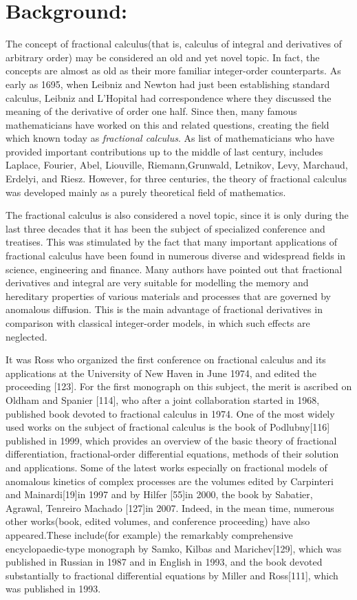 {\section{Background:}
The concept of fractional calculus(that is, calculus of integral and derivatives of arbitrary order) may be considered an old and yet novel topic. In fact, the concepts are almost as old as their more familiar integer-order counterparts. As early as 1695, when Leibniz and Newton had just been establishing standard calculus, Leibniz and L'Hopital had correspondence where they discussed the meaning of the derivative of order one half. Since then, many famous mathematicians have worked on this and related questions, creating the field which known today as \emph{fractional calculus}. As list of mathematicians who have provided important contributions up to the middle of last century, includes Laplace, Fourier, Abel, Liouville, Riemann,Grunwald, Letnikov, Levy, Marchaud, Erdelyi, and Riesz. However, for three centuries, the theory of fractional calculus was developed mainly as a purely theoretical field of mathematics.\

The fractional calculus is also considered a novel topic, since it is only during the last three decades that it has been the subject of specialized conference and treatises. This was stimulated by the fact that many important applications of fractional calculus have been found in numerous diverse and widespread fields in science, engineering and finance. Many authors have pointed out that fractional derivatives and integral are very suitable for modelling the memory and hereditary properties of various materials and processes that are governed by anomalous diffusion. This is the main advantage of fractional derivatives in comparison with classical integer-order models, in which such effects are neglected.\

It was Ross who organized the first conference on fractional calculus and its applications at
the University of New Haven in June 1974, and edited the proceeding [123]. For the first monograph on this subject, the merit is ascribed on Oldham and Spanier [114], who after a joint collaboration started in 1968, published book devoted to fractional calculus in 1974. One of the most widely used works on the subject of fractional calculus is the book of Podlubny[116] published in 1999, which provides an overview of the basic theory of fractional differentiation, fractional-order differential equations, methods of their solution and applications. Some of the latest works especially on fractional models of anomalous kinetics of complex processes are the volumes edited by Carpinteri and Mainardi[19]in 1997 and by
Hilfer [55]in 2000, the book by Sabatier, Agrawal, Tenreiro Machado [127]in 2007. Indeed, in the mean time, numerous other works(book, edited volumes, and conference proceeding) have also appeared.These include(for example) the remarkably comprehensive encyclopaedic-type monograph by Samko, Kilbas and Marichev[129], which was published in Russian in 1987 and in English in 1993, and the book devoted substantially to fractional differential equations by Miller and Ross[111], which was published in 1993.\

}
